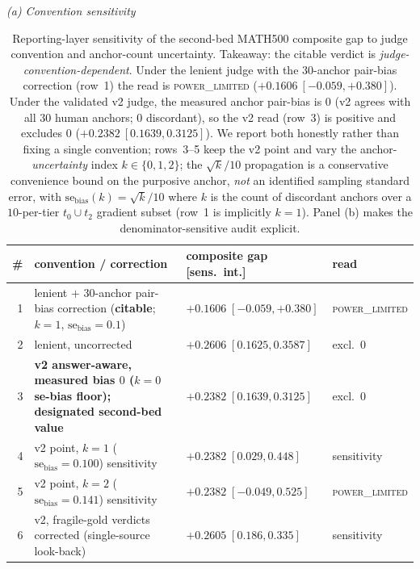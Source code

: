 \documentclass{article}
\begin{document}
\begin{table}[!b]
\centering
\caption{Reporting-layer sensitivity of the second-bed MATH500 composite gap to judge
convention and anchor-count uncertainty.  Takeaway: the citable verdict is
\emph{judge-convention-dependent}.  Under the lenient judge with the $30$-anchor
pair-bias correction (row~1) the read is \textsc{power\_limited}
($+0.1606\ [-0.059,+0.380]$).  Under the validated v2 judge, the measured anchor
pair-bias is $0$ (v2 agrees with all $30$ human anchors; $0$ discordant), so the
v2 read (row~3) is positive and excludes $0$ ($+0.2382\ [0.1639,0.3125]$).  We report
both honestly rather than fixing a single convention; rows~3--5 keep the v2 point and
vary the anchor-\emph{uncertainty} index $k\in\{0,1,2\}$; the $\sqrt{k}/10$
propagation is a conservative convenience bound on the purposive anchor, \emph{not}
an identified sampling standard error, with
$\mathrm{se_{bias}}(k)=\sqrt{k}/10$ where $k$ is the count of discordant anchors over a
$10$-per-tier $t_0\cup t_2$ gradient subset (row~1 is implicitly $k{=}1$).  Panel (b)
makes the denominator-sensitive audit explicit.}
\label{tab:convention}
\textit{(a) Convention sensitivity}\par\smallskip
\begin{tabularx}{\linewidth}{@{}r>{\raggedright\arraybackslash}Xll@{}}
\toprule
\# & convention / correction & composite gap [sens.\ int.] & read\\
\midrule
1 & lenient $+$ 30-anchor pair-bias correction (\textbf{citable}; $k{=}1$, $\mathrm{se_{bias}}{=}0.1$) & $+0.1606\;[-0.059,+0.380]$ & \textsc{power\_limited}\\
2 & lenient, uncorrected & $+0.2606\;[0.1625,0.3587]$ & excl.\ $0$\\
3 & \textbf{v2 answer-aware, measured bias $0$ ($k{=}0$ se-bias floor); designated second-bed value} & $+0.2382\;[0.1639,0.3125]$ & excl.\ $0$\\
4 & v2 point, $k{=}1$ ($\mathrm{se_{bias}}=0.100$) sensitivity & $+0.2382\;[0.029,0.448]$ & sensitivity\\
5 & v2 point, $k{=}2$ ($\mathrm{se_{bias}}=0.141$) sensitivity & $+0.2382\;[-0.049,0.525]$ & \textsc{power\_limited}\\
6 & v2, fragile-gold verdicts corrected (single-source look-back) & $+0.2605\;[0.186,0.335]$ & sensitivity\\

\end{tabularx}
\end{table}
\end{document}
